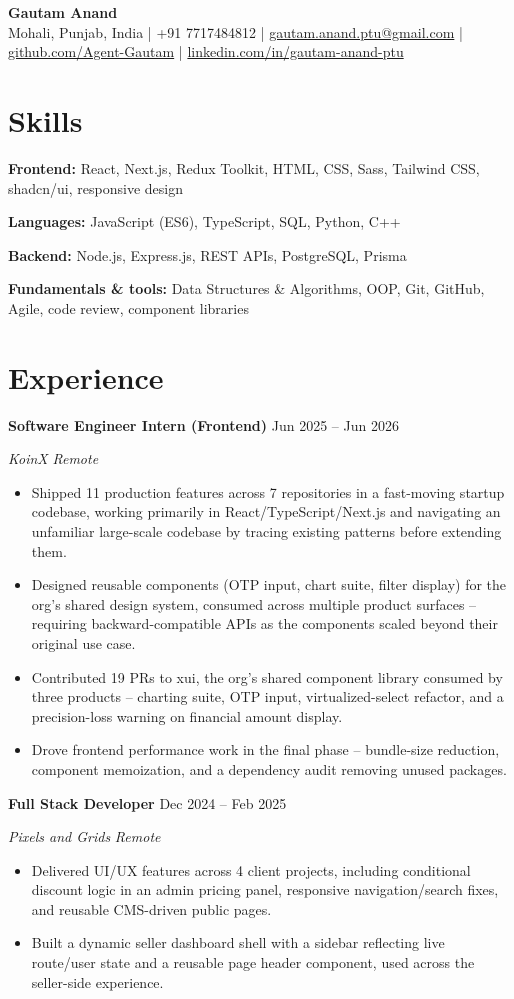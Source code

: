 \documentclass[letterpaper,10.5pt]{article}
\newcommand{\ResumeHeader}[2]{%
  \begin{center}
    {\Huge\bfseries #1}\\[5pt]
    {\small #2}%
  \end{center}\vspace{-6pt}}
\newcommand{\Entry}[4]{%
  \textbf{#1} \hfill {\small #2}\par
  \textit{\small #3} \hfill {\small\textit{#4}}\par\vspace{-1pt}}
\newenvironment{Bullets}
  {\begin{itemize}[leftmargin=1.15em,itemsep=1.5pt,parsep=0pt,topsep=3pt]\small}
  {\end{itemize}\vspace{3pt}}
\newcommand{\SkillRow}[2]{{\small \textbf{#1:} #2}\par\vspace{1.5pt}}
\begin{document}
\ResumeHeader{Gautam Anand}
  {Mohali, Punjab, India \;|\; +91 7717484812 \;|\;
   \href{mailto:gautam.anand.ptu@gmail.com}{gautam.anand.ptu@gmail.com} \;|\;
   \href{https://github.com/Agent-Gautam}{github.com/Agent-Gautam} \;|\;
   \href{https://www.linkedin.com/in/gautam-anand-ptu}{linkedin.com/in/gautam-anand-ptu}}

\section{Skills}
\SkillRow{Frontend}{React, Next.js, Redux Toolkit, HTML, CSS, Sass, Tailwind CSS, shadcn/ui, responsive design}
\SkillRow{Languages}{JavaScript (ES6), TypeScript, SQL, Python, C++}
\SkillRow{Backend}{Node.js, Express.js, REST APIs, PostgreSQL, Prisma}
\SkillRow{Fundamentals \& tools}{Data Structures \& Algorithms, OOP, Git, GitHub, Agile, code review, component libraries}

\section{Experience}
\Entry{Software Engineer Intern (Frontend)}{Jun 2025 -- Jun 2026}{KoinX}{Remote}
\begin{Bullets}
  \item Shipped 11 production features across 7 repositories in a fast-moving startup codebase, working primarily in React/TypeScript/Next.js and navigating an unfamiliar large-scale codebase by tracing existing patterns before extending them.
  \item Designed reusable components (OTP input, chart suite, filter display) for the org's shared design system, consumed across multiple product surfaces -- requiring backward-compatible APIs as the components scaled beyond their original use case.
  \item Contributed 19 PRs to xui, the org's shared component library consumed by three products -- charting suite, OTP input, virtualized-select refactor, and a precision-loss warning on financial amount display.
  \item Drove frontend performance work in the final phase -- bundle-size reduction, component memoization, and a dependency audit removing unused packages.
\end{Bullets}

\Entry{Full Stack Developer}{Dec 2024 -- Feb 2025}{Pixels and Grids}{Remote}
\begin{Bullets}
  \item Delivered UI/UX features across 4 client projects, including conditional discount logic in an admin pricing panel, responsive navigation/search fixes, and reusable CMS-driven public pages.
  \item Built a dynamic seller dashboard shell with a sidebar reflecting live route/user state and a reusable page header component, used across the seller-side experience.
\end{Bullets}
\end{document}
